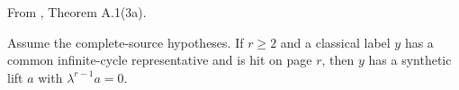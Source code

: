 \begin{theorem}
\label{sem:Literature:complete-boundary-lift}
From \cite{BHS}, Theorem A.1(3a).\par

Assume the complete-source hypotheses. If $r\ge2$ and a classical label $y$ has a common infinite-cycle representative and is hit on page $r$, then $y$ has a synthetic lift $a$ with $\lambda^{r-1}a=0$.
\end{theorem}

